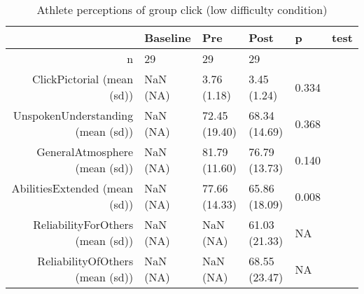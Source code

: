 \begin{table}[ht]
\centering
\begin{tabular}{rlllll}
  \hline
 & Baseline & Pre & Post & p & test \\ 
  \hline
n &  29 &    29 &    29 &  &  \\ 
  ClickPictorial (mean (sd)) & NaN (NA) &  3.76 (1.18) &  3.45 (1.24) &  0.334 &  \\ 
  UnspokenUnderstanding (mean (sd)) & NaN (NA) & 72.45 (19.40) & 68.34 (14.69) &  0.368 &  \\ 
  GeneralAtmosphere (mean (sd)) & NaN (NA) & 81.79 (11.60) & 76.79 (13.73) &  0.140 &  \\ 
  AbilitiesExtended (mean (sd)) & NaN (NA) & 77.66 (14.33) & 65.86 (18.09) &  0.008 &  \\ 
  ReliabilityForOthers (mean (sd)) & NaN (NA) &   NaN (NA) & 61.03 (21.33) &  NA &  \\ 
  ReliabilityOfOthers (mean (sd)) & NaN (NA) &   NaN (NA) & 68.55 (23.47) &  NA &  \\ 
   \hline
\end{tabular}
\caption{Athlete perceptions of 
 group click (low difficulty condition)} 
\end{table}
